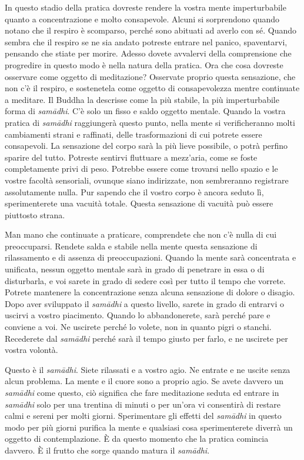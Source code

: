 In questo stadio della pratica dovreste rendere la vostra mente
imperturbabile quanto a concentrazione e molto consapevole. Alcuni si
sorprendono quando notano che il respiro è scomparso, perché sono
abituati ad averlo con sé. Quando sembra che il respiro se ne sia andato
potreste entrare nel panico, spaventarvi, pensando che stiate per
morire. Adesso dovete avvalervi della comprensione che progredire in
questo modo è nella natura della pratica. Ora che cosa dovreste
osservare come oggetto di meditazione? Osservate proprio questa
sensazione, che non c'è il respiro, e sostenetela come oggetto di
consapevolezza mentre continuate a meditare. Il Buddha la descrisse come
la più stabile, la più imperturbabile forma di \emph{samādhi}. C'è solo
un fisso e saldo oggetto mentale. Quando la vostra pratica di
\emph{samādhi} raggiungerà questo punto, nella mente si verificheranno
molti cambiamenti strani e raffinati, delle trasformazioni di cui
potrete essere consapevoli. La sensazione del corpo sarà la più lieve
possibile, o potrà perfino sparire del tutto. Potreste sentirvi
fluttuare a mezz'aria, come se foste completamente privi di peso.
Potrebbe essere come trovarsi nello spazio e le vostre facoltà
sensoriali, ovunque siano indirizzate, non sembreranno registrare
assolutamente nulla. Pur sapendo che il vostro corpo è ancora seduto lì,
sperimenterete una vacuità totale. Questa sensazione di vacuità può
essere piuttosto strana.

Man mano che continuate a praticare, comprendete che non c'è nulla di
cui preoccuparsi. Rendete salda e stabile nella mente questa sensazione
di rilassamento e di assenza di preoccupazioni. Quando la mente sarà
concentrata e unificata, nessun oggetto mentale sarà in grado di
penetrare in essa o di disturbarla, e voi sarete in grado di sedere così
per tutto il tempo che vorrete. Potrete mantenere la concentrazione
senza alcuna sensazione di dolore o disagio. Dopo aver sviluppato il
\emph{samādhi} a questo livello, sarete in grado di entrarvi o uscirvi a
vostro piacimento. Quando lo abbandonerete, sarà perché pare e conviene
a voi. Ne uscirete perché lo volete, non in quanto pigri o stanchi.
Recederete dal \emph{samādhi} perché sarà il tempo giusto per farlo, e
ne uscirete per vostra volontà.

Questo è il \emph{samādhi}. Siete rilassati e a vostro agio. Ne entrate
e ne uscite senza alcun problema. La mente e il cuore sono a proprio
agio. Se avete davvero un \emph{samādhi} come questo, ciò significa che
fare meditazione seduta ed entrare in \emph{samādhi} solo per una
trentina di minuti o per un'ora vi consentirà di restare calmi e sereni
per molti giorni. Sperimentare gli effetti del \emph{samādhi} in questo
modo per più giorni purifica la mente e qualsiasi cosa sperimenterete
diverrà un oggetto di contemplazione. È da questo momento che la pratica
comincia davvero. È il frutto che sorge quando matura il \emph{samādhi}.


